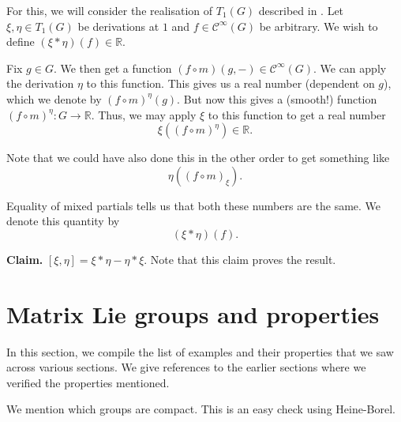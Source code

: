 \documentclass[12pt]{article}
\begin{document}
\begin{sketch}
	For this, we will consider the realisation of $T_{1}(G)$ described in . 
	Let $\xi, \eta \in T_{1}(G)$ be derivations at $1$ and $f \in \mathcal{C}^{\infty}(G)$ be arbitrary. 
	We wish to define $(\xi \ast \eta)(f) \in \mathbb{R}$. 

	Fix $g \in G$. We then get a function $(f \circ m)(g, -) \in \mathcal{C}^{\infty}(G)$. 
	We can apply the derivation $\eta$ to this function. 
	This gives us a real number (dependent on $g$), which we denote by $(f \circ m)^{\eta}(g)$. 
	But now this gives a (smooth!) function $(f \circ m)^{\eta} \colon G \to \mathbb{R}$. 
	Thus, we may apply $\xi$ to this function to get a real number
	\begin{equation*} 
		\xi\left((f \circ m)^{\eta}\right) \in \mathbb{R}.
	\end{equation*}

	Note that we could have also done this in the other order to get something like
	\begin{equation*} 
		\eta\left((f \circ m)_{\xi}\right).
	\end{equation*}

	Equality of mixed partials tells us that both these numbers are the same. 
	We denote this quantity by
	\begin{equation*} 
		(\xi \ast \eta)(f).
	\end{equation*}

	\textbf{Claim.} $[\xi, \eta] = \xi \ast \eta - \eta \ast \xi$. \newline
	Note that this claim proves the result.


\end{sketch}

\section{Matrix Lie groups and properties}

In this section, we compile the list of examples and their properties that we saw across various sections. 
We give references to the earlier sections where we verified the properties mentioned.

We mention which groups are compact. This is an easy check using Heine-Borel.
\end{document}
